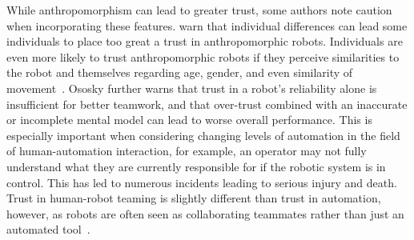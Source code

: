 While anthropomorphism can lead to greater trust, some authors note caution when incorporating these features.
\citeauthor{culley_note_2013} warn that individual differences can lead some individuals to place too great a trust in anthropomorphic robots.
Individuals are even more likely to trust anthropomorphic robots if they perceive similarities to the robot and themselves regarding age, gender, and even similarity of movement~\citep{verberne_trusting_2013, pak_multi-level_2014}.
Ososky further warns that trust in a robot's reliability alone is insufficient for better teamwork, and that over-trust combined with an inaccurate or incomplete mental model can lead to worse overall performance.
This is especially important when considering changing levels of automation in the field of human-automation interaction, for example, an operator may not fully understand what they are currently responsible for if the robotic system is in control.
This has led to numerous incidents leading to serious injury and death.
Trust in human-robot teaming is slightly different than trust in automation, however, as robots are often seen as collaborating teammates rather than just an automated tool~\citep{ososky_building_2013}.

